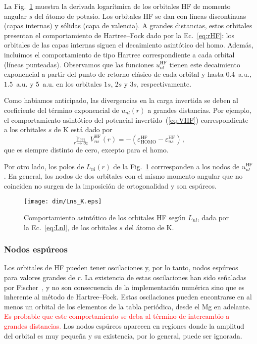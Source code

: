 La Fig.~\ref{fig:LnsK} muestra la derivada logarítmica de los orbitales 
HF de momento angular $s$ del átomo de potasio. Los orbitales HF se dan con líneas discontinuas (capas internas) y sólidas (capa de valencia). A grandes distancias, estos orbitales presentan el comportamiento de Hartree--Fock dado por la Ec.~\ref{eq:rHF}: los orbitales de las capas internas siguen el decaimiento asintótico del \acs{homo}. Además, incluimos el comportamiento de tipo Hartree correspondiente a cada orbital (líneas punteadas). Observamos que las funciones $u_{nl}^{\mathrm{HF}}$ tienen este decaimiento exponencial a partir del punto de retorno clásico de cada orbital y hasta $0.4$~a.u., $1.5$~a.u. y 5~a.u. en los orbitales $1s$, $2s$ y $3s$, respectivamente. 

Como habiamos anticipado, las divergencias en la carga invertida se deben al coeficiente del término exponencial de $u_{nl}(r)$ a grandes distancias. Por ejemplo, el comportamiento asintótico del potencial invertido~(\ref{eq:VHF}) correspondiente a los orbitales $s$ de K está dado por
\begin{equation}
\lim_{r \rightarrow \infty} V_{ns}^{\mathrm{HF}}(r)=-\left(\varepsilon_{\mathrm{HOMO}}^{\mathrm{HF}}-\varepsilon_{ns}^{\mathrm{HF}}\right) \,,
\label{eq:asintoticoVHF}
\end{equation}
que es siempre distinto de cero, excepto para el \acs{homo}.

Por otro lado, los polos de $L_{nl}(r)$ de la Fig.~\ref{fig:LnsK}  
corrresponden a los nodos de $u_{nl}^{\mathrm{HF}}$. En general, los 
nodos de dos orbitales con el mismo momento angular que no coinciden no 
surgen de la imposición de ortogonalidad y son espúreos. 

\begin{figure}
\centering
\texttt{[image: dim/Lns\_K.eps]} 
\caption[Comportamiento asintótico de los orbitales HF.]
{Comportamiento asintótico de los orbitales HF según $L_{nl}$, dada por la Ec.~\ref{eq:Lnl}, de los orbitales $s$ del átomo de K.}
\label{fig:LnsK}
\end{figure}

\subsubsection{Nodos espúreos}
\label{subsubsec:espureos}

Los orbitales de HF pueden tener oscilaciones y, por lo tanto, nodos 
espúreos para valores grandes de $r$. La existencia de estas oscilaciones han sido señaladas por Fischer~\cite{FroeseFischer:97}, y no son consecuencia de la implementación numérica sino que es inherente al método de Hartree--Fock. Estas oscilaciones pueden encontrarse en al menos un orbital de los elementos de la tabla periódica, desde el Mg en adelante. \textcolor{red}{Es probable que este comportamiento se deba al término de intercambio a grandes distancias.} Los nodos espúreos aparecen en regiones donde la amplitud del orbital es muy pequeña y su existencia, por lo general, puede ser ignorada.


